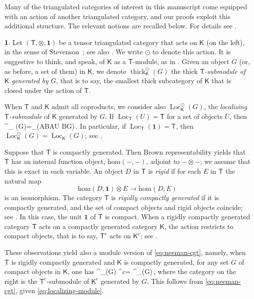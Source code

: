 \documentclass{amsart}
\let\oldequation\equation
\let\oldendequation\endequation
\renewenvironment{equation}{\linenomathNonumbers\oldequation}{\oldendequation\endlinenomath}
\newcommand{\cat}[1]{{\mathsf{#1}}}
\newcommand{\Loc}{\operatorname{Loc}}
\newcommand{\one}{\mathbf{1}}
\newcommand{\thick}{\operatorname{thick}}
\theoremstyle{definition}
\newtheorem{chunk}[subsection]{}
\theoremstyle{remark}
\numberwithin{equation}{subsection}
\begin{document}
Many of the triangulated categories of interest in this manuscript come equipped with an action of another triangulated category, and our proofs exploit this additional structure. The relevant notions are recalled below. For details see \cite{Stevenson:2013a}.

\begin{chunk}
\label{ch:actions}
Let $(\cat T,\otimes,\one)$ be a tensor triangulated category that acts on $\cat K$ (on the left), in the sense of Stevenson~\cite[Section~3]{Stevenson:2013a}; see also \cite{Stevenson:2018a}. We write $\odot$ to denote this action. It is suggestive to think, and speak, of $\cat K$ as a $\cat T$-module, as in \cite{Stevenson:2013a,Stevenson:2014b}. Given an object $G$ (or, as before, a set of them) in $\cat K$, we denote $\thick^{\odot}_{\cat K}(G)$ the thick \emph{$\cat T$-submodule of $\cat K$ generated by $G$}, that is to say, the smallest thick subcategory of $\cat K$ that is closed under the action of $\cat T$.

When $\cat T$ and $\cat K$ admit all coproducts, we consider also $\Loc^{\odot}_{\cat K}(G)$, the \emph{localizing $\cat T$-submodule} of $\cat K$ generated by $G$. If  $\Loc_{\cat T}(U)=\cat T$ for a set of objects $U$, then
\begin{equation}
\label{eq:localizing-module}
\Loc^{\odot}_{\cat K} (G)=\Loc_{\cat K}(A\odot B\mid A\in U  B\in G)\,. 
\end{equation}
In particular, if $\Loc_{\cat T}(\one)=\cat T$, then $\Loc^{\odot}_{\cat K}(G)=\Loc_{\cat K}(G)$; see \cite[Lemma~3.13]{Stevenson:2013a}.

Suppose that $\cat T$ is compactly generated. Then Brown representability yields that $\cat T$ has an internal function object, $\mathrm{hom}(-,-)$, adjoint to $-\otimes-$; we assume that this is exact in each variable. An object $D$ in $\cat T$ is \emph{rigid} if for each $E$ in $\cat T$ the natural map
\[
\mathrm{hom}(D,\one)\otimes E \longrightarrow \mathrm{hom}(D,E)
\]
is an isomorphism. The category $\cat T$ is \emph{rigidly compactly generated} if it is compactly generated, and the set of compact objects and rigid objects coincide; see \cite[Defintion~4.1]{Stevenson:2013a}. In this case, the unit $\one$ of $\cat T$ is compact. When a rigidly compactly generated category $\cat T$ acts on a compactly generated category $\cat K$, the action restricts to compact objects, that is to say, ${\cat T}^{\mathrm c}$ acts on ${\cat K}^{\mathrm c}$; see \cite[Lemma~4.6]{Stevenson:2013a}.

These observations yield also a module version of \cref{eq:neeman-cgt}, namely, when $\cat T$ is rigidly compactly generated and $\cat K$ is compactly generated, for any set $G$ of compact objects in $\cat K$, one has
\begin{equation}
\label{eq:neeman-tt}
\Loc^{\odot}_{\cat K}(G) \cap {\cat K}^{\mathrm c}= \thick^{\odot}_{\cat K}(G)\,, 
\end{equation}
where the category on the right is the $\cat T^{\mathrm c}$-submodule of ${\cat K}^{\mathrm c}$ generated by $G$. This follows from \eqref{eq:neeman-cgt}, given \eqref{eq:localizing-module}.
\end{chunk}
\end{document}
